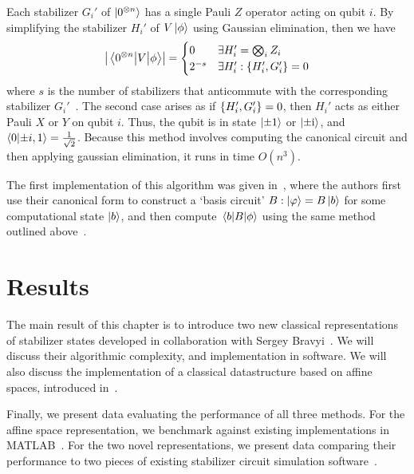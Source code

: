 Each stabilizer $G_{i}'$ of $\ket{0^{\otimes n}}$ has a single Pauli $Z$ operator acting on qubit $i$. By simplifying the stabilizer $H_{i}'$ of $V\ket{\phi}$ using Gaussian elimination, then we have
\begin{equation}
\left\vert \matrixel{0^{\otimes n}}{V}{\phi}\right\vert = \begin{cases}
 0 & \exists H_{i}' = \bigotimes_{i}Z_{i}\\
 2^{-s} & \exists H_{i}' : \acomm{H_{i}'}{G_{i}'} = 0
\end{cases}
\end{equation}
where $s$ is the number of stabilizers that anticommute with the corresponding stabilizer $G_{i}'$~\cite{Aaronson2004}. The second case arises as if $\acomm{H_{i}'}{G_{i}'} = 0$, then $H_{i}'$ acts as either Pauli $X$ or $Y$ on qubit $i$. Thus, the qubit is in state $\ket{\pm 1}$ or $\ket{\pm\mathrm{i}}$, and $\braket{0}{\pm i,1}=\frac{1}{\sqrt{2}}$. Because this method involves computing the canonical circuit and then applying gaussian elimination, it runs in time $O(n^{3})$.\par
The first implementation of this algorithm was given in~\cite{Garcia2012}, where the authors first use their canonical form to construct a `basis circuit' $B : \ket{\varphi}=B\ket{b}$ for some computational state $\ket{b}$, and then compute $\matrixel{b}{B}{\phi}$ using the same method outlined above~\cite{Garcia2012}.
\section{Results}
The main result of this chapter is to introduce two new classical representations of stabilizer states developed in collaboration with Sergey Bravyi~\cite{Bravyi2018}. We will discuss their algorithmic complexity, and implementation in software. We will also discuss the implementation of a classical datastructure based on affine spaces, introduced in~\cite{Bravyi2016}.\par
Finally, we  present data evaluating the performance of all three methods. For the affine space representation, we benchmark against existing implementations in MATLAB~\cite{Bravyi2016}. For the two novel representations, we present data comparing their performance to two pieces of existing stabilizer circuit simulation software~\cite{Aaronson2004,Anders2006}.
